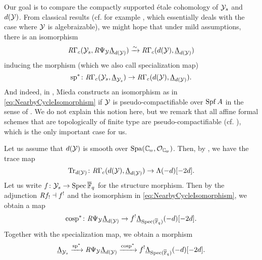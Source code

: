 \documentclass[../main.tex]{subfiles}
\begin{document}
Our goal is to compare the compactly supported \'etale cohomology of $\mathcal{Y}_s$
and $d(\mathcal{Y})$.
From classical results (cf. for example \cite[Corollary 0.7.9]{huber2013etale}, which
essentially deals with the case where $\mathcal{Y}$ is algebraizable),
we might hope that under mild assumptions, there is an isomorphism
\begin{equation}\label{eq:NearbyCycleIsomorphism}
  \mathit R\Gamma_c(\mathcal{Y}_s, \mathit R\Psi_{\mathcal{Y}} \underline \Lambda_{d(\mathcal{Y})}) \xrightarrow{\sim} \mathit R\Gamma_c
  (d(\mathcal{Y}), \underline \Lambda_{d(\mathcal{Y})})
\end{equation}
inducing the morphism (which we also call specialization map)
\begin{equation*}
  \mathrm{sp}^*\colon \mathit R\Gamma_c(\mathcal{Y}_s, \underline \Lambda_{\mathcal{Y}_s}) \to \mathit R
  \Gamma_c(d(\mathcal{Y}), \underline \Lambda_{d(\mathcal{Y})}).
\end{equation*}
And indeed, in \cite[Corollary 4.29]{mieda2014variants}, Mieda constructs an
isomorphism as in \eqref{eq:NearbyCycleIsomorphism}
if $\mathcal{Y}$ is pseudo-compactifiable over $\operatorname{Spf} A$ in the sense of \cite[Definition
4.24]{mieda2014variants}. We do not explain this notion here, but we remark that
all affine formal schemes that are topologically of finite type are
pseudo-compactifiable (cf. \cite[Example 4.25]{mieda2014variants}), which is
the only important case for us.

Let us assume that $d(\mathcal{Y})$ is smooth over $\Spa(\Cp, \cO_\Cp)$. Then, by
\cite[Theorem 7.3.4]{huber2013etale}, we have the trace map
\begin{equation*}
  \operatorname{Tr}_{d(\mathcal{Y})} \colon \mathit R  \Gamma_c( d(\mathcal{Y}), \underline \Lambda_{d(\mathcal{Y})} ) \to 
  \Lambda (-d)[-2d].
\end{equation*}
Let us write $f \colon \mathcal{Y}_s \to \operatorname{Spec}{\overline {\mathbb{F}}_q}$ for the structure morphism. Then by the 
adjunction $\mathit R f_! \dashv f^!$ and the isomorphism in \eqref{eq:NearbyCycleIsomorphism},
we obtain a map
\begin{equation*}
  \mathrm{cosp}^* \colon \mathit R\Psi_{\mathcal{Y}} \underline\Lambda_{d(\mathcal{Y})} \to f^!
  \underline\Lambda_{\operatorname{Spec}({\overline {\mathbb{F}}_q})}(-d)[-2d].
\end{equation*}
Together with the specialization map, we obtain a morphism
\begin{equation*}
  \underline \Lambda_{\mathcal{Y}_s} \xrightarrow{\mathrm{sp}^*} \mathit R\Psi_{\mathcal{Y}} \underline\Lambda_{d(\mathcal{Y})} 
  \xrightarrow{\mathrm{cosp}^*} f^! \underline\Lambda_{\operatorname{Spec}({\overline {\mathbb{F}}_q})}(-d)[-2d].
\end{equation*}
\end{document}
